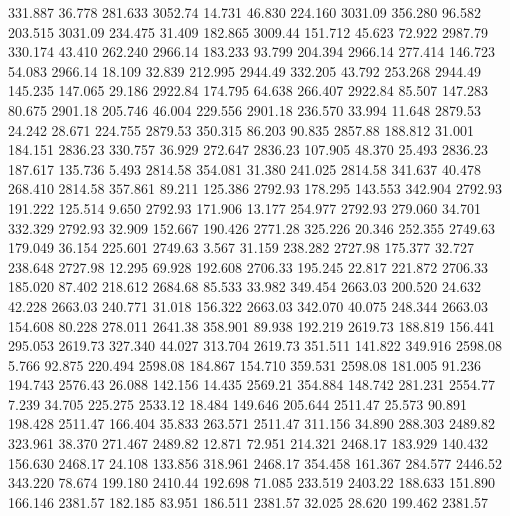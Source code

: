  331.887   36.778  281.633      3052.74
  14.731   46.830  224.160      3031.09
 356.280   96.582  203.515      3031.09
 234.475   31.409  182.865      3009.44
 151.712   45.623   72.922      2987.79
 330.174   43.410  262.240      2966.14
 183.233   93.799  204.394      2966.14
 277.414  146.723   54.083      2966.14
  18.109   32.839  212.995      2944.49
 332.205   43.792  253.268      2944.49
 145.235  147.065   29.186      2922.84
 174.795   64.638  266.407      2922.84
  85.507  147.283   80.675      2901.18
 205.746   46.004  229.556      2901.18
 236.570   33.994   11.648      2879.53
  24.242   28.671  224.755      2879.53
 350.315   86.203   90.835      2857.88
 188.812   31.001  184.151      2836.23
 330.757   36.929  272.647      2836.23
 107.905   48.370   25.493      2836.23
 187.617  135.736    5.493      2814.58
 354.081   31.380  241.025      2814.58
 341.637   40.478  268.410      2814.58
 357.861   89.211  125.386      2792.93
 178.295  143.553  342.904      2792.93
 191.222  125.514    9.650      2792.93
 171.906   13.177  254.977      2792.93
 279.060   34.701  332.329      2792.93
  32.909  152.667  190.426      2771.28
 325.226   20.346  252.355      2749.63
 179.049   36.154  225.601      2749.63
   3.567   31.159  238.282      2727.98
 175.377   32.727  238.648      2727.98
  12.295   69.928  192.608      2706.33
 195.245   22.817  221.872      2706.33
 185.020   87.402  218.612      2684.68
  85.533   33.982  349.454      2663.03
 200.520   24.632   42.228      2663.03
 240.771   31.018  156.322      2663.03
 342.070   40.075  248.344      2663.03
 154.608   80.228  278.011      2641.38
 358.901   89.938  192.219      2619.73
 188.819  156.441  295.053      2619.73
 327.340   44.027  313.704      2619.73
 351.511  141.822  349.916      2598.08
   5.766   92.875  220.494      2598.08
 184.867  154.710  359.531      2598.08
 181.005   91.236  194.743      2576.43
  26.088  142.156   14.435      2569.21
 354.884  148.742  281.231      2554.77
   7.239   34.705  225.275      2533.12
  18.484  149.646  205.644      2511.47
  25.573   90.891  198.428      2511.47
 166.404   35.833  263.571      2511.47
 311.156   34.890  288.303      2489.82
 323.961   38.370  271.467      2489.82
  12.871   72.951  214.321      2468.17
 183.929  140.432  156.630      2468.17
  24.108  133.856  318.961      2468.17
 354.458  161.367  284.577      2446.52
 343.220   78.674  199.180      2410.44
 192.698   71.085  233.519      2403.22
 188.633  151.890  166.146      2381.57
 182.185   83.951  186.511      2381.57
  32.025   28.620  199.462      2381.57
